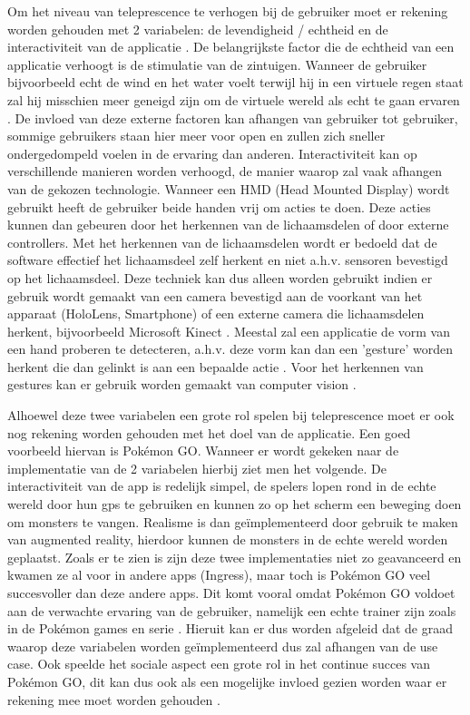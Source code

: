 Om het niveau van teleprescence te verhogen bij de gebruiker moet er rekening worden gehouden met 2 variabelen: de levendigheid / echtheid en de interactiviteit van de applicatie \autocite{Steuer1992}.
De belangrijkste factor die de echtheid van een applicatie verhoogt is de stimulatie van de zintuigen. Wanneer de gebruiker bijvoorbeeld echt de wind en het water voelt terwijl hij in een virtuele regen staat zal hij misschien meer geneigd zijn om de virtuele wereld als echt te gaan ervaren \autocite{Steuer1992}. De invloed van deze externe factoren kan afhangen van gebruiker tot gebruiker, sommige gebruikers staan hier meer voor open en zullen zich sneller ondergedompeld voelen in de ervaring dan anderen.
Interactiviteit kan op verschillende manieren worden verhoogd, de manier waarop zal vaak afhangen van de gekozen technologie. Wanneer een HMD (Head Mounted Display) wordt gebruikt heeft de gebruiker beide handen vrij om acties te doen. Deze acties kunnen dan gebeuren door het herkennen van de lichaamsdelen of door externe controllers.
Met het herkennen van de lichaamsdelen wordt er bedoeld dat de software effectief het lichaamsdeel zelf herkent en niet a.h.v. sensoren bevestigd op het lichaamsdeel. Deze techniek kan dus alleen worden gebruikt indien er gebruik wordt gemaakt van een camera bevestigd aan de voorkant van het apparaat (HoloLens, Smartphone) of een externe camera die lichaamsdelen herkent, bijvoorbeeld Microsoft Kinect \autocite{Ren2013}.
Meestal zal een applicatie de vorm van een hand proberen te detecteren, a.h.v. deze vorm kan dan een 'gesture' worden herkent die dan gelinkt is aan een bepaalde actie \autocite{Piumsomboon2013}. 
Voor het herkennen van gestures kan er gebruik worden gemaakt van computer vision \autocite{Ji2010}.


Alhoewel deze twee variabelen een grote rol spelen bij teleprescence moet er ook nog rekening worden gehouden met het doel van de applicatie. Een goed voorbeeld hiervan is Pokémon GO. Wanneer er wordt gekeken naar de implementatie van de 2 variabelen hierbij ziet men het volgende. De interactiviteit van de app is redelijk simpel, de spelers lopen rond in de echte wereld door hun gps te gebruiken en kunnen zo op het scherm een beweging doen om monsters te vangen. Realisme is dan geïmplementeerd door gebruik te maken van augmented reality, hierdoor kunnen de monsters in de echte wereld worden geplaatst. Zoals er te zien is zijn deze twee implementaties niet zo geavanceerd en kwamen ze al voor in andere apps (Ingress), maar toch is Pokémon GO veel succesvoller dan deze andere apps. Dit komt vooral omdat Pokémon GO voldoet aan de verwachte ervaring van de gebruiker, namelijk een echte trainer zijn zoals in de Pokémon games en serie \autocite{Tang2017}. Hieruit kan er dus worden afgeleid dat de graad waarop deze variabelen worden geïmplementeerd dus zal afhangen van de use case. Ook speelde het sociale aspect een grote rol in het continue succes van Pokémon GO, dit kan dus ook als een mogelijke invloed gezien worden waar er rekening mee moet worden gehouden \autocite{Tang2017}.


